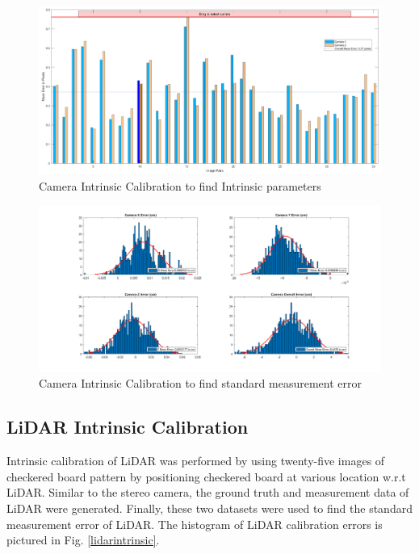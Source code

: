 \begin{figure}
    \centering
    \includegraphics[scale= 0.27]{Images/camintrinsic1.png}
    \caption{Camera Intrinsic Calibration to find Intrinsic parameters}
    \label{camintrinsic1}
\end{figure}

\begin{figure}
    \centering
    \includegraphics[scale= 0.3]{Images/Cam_intrinsic.png}
    \caption{Camera Intrinsic Calibration to find standard measurement error}
    \label{camintrinsic2}
\end{figure}

\subsection{LiDAR Intrinsic Calibration}
Intrinsic calibration of LiDAR was performed by using twenty-five images of checkered board pattern by positioning checkered board at various location w.r.t LiDAR. Similar to the stereo camera, the ground truth and measurement data of LiDAR were generated. Finally, these two datasets were used to find the standard measurement error of LiDAR. The histogram of LiDAR calibration errors is pictured in Fig. \ref{lidarintrinsic}.

